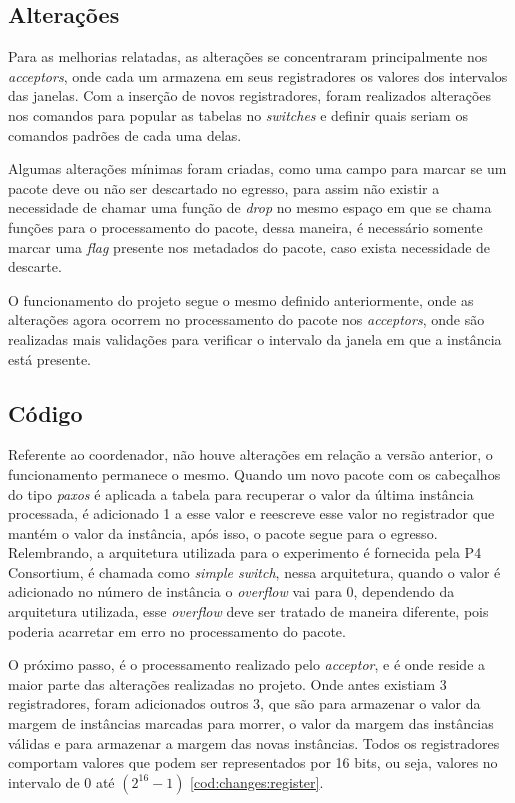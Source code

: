 \documentclass[
    12pt,
    openright, 
    oneside,
    a4paper,
    french,
    english,
    brazil
    ]{facom-ufu-abntex2}
\theoremstyle{definition}
\begin{document}
\subsection{Alterações}
Para as melhorias relatadas, as alterações se concentraram principalmente nos \emph{acceptors}, onde cada um armazena 
em seus registradores os valores dos intervalos das janelas. Com a inserção de novos registradores, foram
realizados alterações nos comandos para popular as tabelas no \emph{switches} e definir quais seriam os comandos padrões
de cada uma delas.

Algumas alterações mínimas foram criadas, como uma campo para marcar se um pacote deve ou não ser descartado no egresso,
para assim não existir a necessidade de chamar uma função de \emph{drop} no mesmo espaço em que se chama funções para o
processamento do pacote, dessa maneira, é necessário somente marcar uma \emph{flag} presente nos metadados do pacote,
caso exista necessidade de descarte.

O funcionamento do projeto segue o mesmo definido anteriormente, onde as alterações agora ocorrem no processamento
do pacote nos \emph{acceptors}, onde são realizadas mais validações para verificar o intervalo da janela em que a instância
está presente.

\subsection{Código}
Referente ao coordenador, não houve alterações em relação a versão anterior, o funcionamento permanece o mesmo.
Quando um novo pacote com os cabeçalhos do tipo \emph{paxos} é aplicada a tabela para recuperar o valor da última instância
processada, é adicionado 1 a esse valor e reescreve esse valor no registrador que mantém o valor da instância, após isso,
o pacote segue para o egresso. Relembrando, a arquitetura utilizada para o experimento é fornecida pela P4 Consortium, é
chamada como \emph{simple switch}, nessa arquitetura, quando o valor é adicionado no número de instância o \emph{overflow} vai para
0, dependendo da arquitetura utilizada, esse \emph{overflow} deve ser tratado de maneira diferente, pois poderia acarretar em
erro no processamento do pacote.



O próximo passo, é o processamento realizado pelo \emph{acceptor}, e é onde reside a maior parte das alterações realizadas no projeto.
Onde antes existiam 3 registradores, foram adicionados outros 3, que são para armazenar o valor da margem de instâncias marcadas
para morrer, o valor da margem das instâncias válidas e para armazenar a margem das novas instâncias. Todos os registradores
comportam valores que podem ser representados por 16 bits, ou seja, valores no intervalo de 0 até $(2^{16} - 1)$ \ref{cod:changes:register}.
\end{document}
